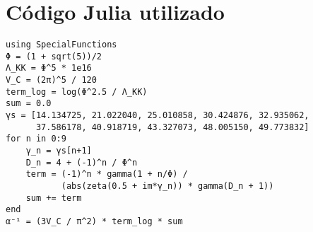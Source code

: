 \documentclass[11pt]{article}
\begin{document}
\section*{Código Julia utilizado}

\begin{verbatim}
using SpecialFunctions
Φ = (1 + sqrt(5))/2
Λ_KK = Φ^5 * 1e16
V_C = (2π)^5 / 120
term_log = log(Φ^2.5 / Λ_KK)
sum = 0.0
γs = [14.134725, 21.022040, 25.010858, 30.424876, 32.935062,
      37.586178, 40.918719, 43.327073, 48.005150, 49.773832]
for n in 0:9
    γ_n = γs[n+1]
    D_n = 4 + (-1)^n / Φ^n
    term = (-1)^n * gamma(1 + n/Φ) / 
           (abs(zeta(0.5 + im*γ_n)) * gamma(D_n + 1))
    sum += term
end
α⁻¹ = (3V_C / π^2) * term_log * sum
\end{verbatim}
\end{document}
